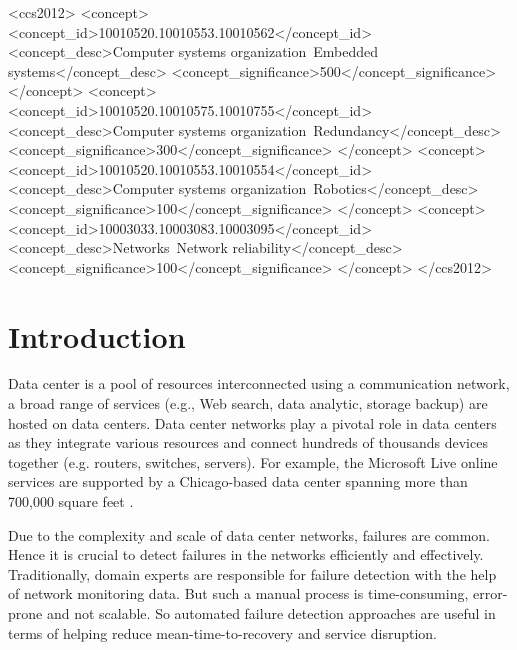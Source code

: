 \documentclass{sig-alternate-05-2015}
\begin{document}
%
%
\begin{CCSXML}
<ccs2012>
 <concept>
  <concept_id>10010520.10010553.10010562</concept_id>
  <concept_desc>Computer systems organization~Embedded systems</concept_desc>
  <concept_significance>500</concept_significance>
 </concept>
 <concept>
  <concept_id>10010520.10010575.10010755</concept_id>
  <concept_desc>Computer systems organization~Redundancy</concept_desc>
  <concept_significance>300</concept_significance>
 </concept>
 <concept>
  <concept_id>10010520.10010553.10010554</concept_id>
  <concept_desc>Computer systems organization~Robotics</concept_desc>
  <concept_significance>100</concept_significance>
 </concept>
 <concept>
  <concept_id>10003033.10003083.10003095</concept_id>
  <concept_desc>Networks~Network reliability</concept_desc>
  <concept_significance>100</concept_significance>
 </concept>
</ccs2012>
\end{CCSXML}



%
%

%
%



\section{Introduction}
Data center is a pool of resources interconnected using a communication network, a broad range of services (e.g., Web search, data analytic, storage backup) are hosted on data centers. Data center networks play a pivotal role in data centers as they integrate various resources and connect hundreds of thousands devices together (e.g. routers, switches, servers). For example, the Microsoft Live online services are supported by a Chicago-based
data center spanning more than 700,000 square feet \cite{DBLP:series/sbcs/LiuMVLH13}.

Due to the complexity and scale of data center networks, failures are common. Hence it is crucial to detect failures in the networks efficiently and effectively. Traditionally, domain experts are responsible for failure detection with the help of network monitoring data. But such a manual process is time-consuming, error-prone and not scalable. So automated failure detection approaches are useful in terms of helping reduce mean-time-to-recovery and service disruption.
\end{document}

